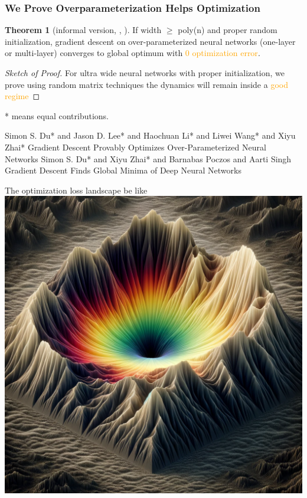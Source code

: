 \documentclass{beamer}   	%
\theoremstyle{definition}
\newtheorem*{thm}{Theorem}
\newcommand{\highlight}[1]{\textcolor{orange}{#1}}
\begin{document}
\begin{frame}
\frametitle{We Prove Overparameterization Helps Optimization}
\begin{thm}
	[informal version, \cite{op1}, \cite{op2}]
	If width $\ge$ poly(n) and proper random initialization, gradient descent on over-parameterized neural networks (one-layer or multi-layer) converges to global optimum with \highlight{0 optimization error}.
\end{thm}

\begin{proof}
	[Sketch of Proof]

	For ultra wide neural networks with proper initialization, we prove using random matrix techniques the dynamics will remain inside a \highlight{good regime}
\end{proof}

* means equal contributions.

\begin{thebibliography}{9}
\scriptsize
{}
Simon S. Du* and Jason D. Lee* and Haochuan Li* and Liwei Wang* and Xiyu Zhai*
Gradient Descent Provably Optimizes Over-Parameterized Neural Networks
Simon S. Du* and Xiyu Zhai* and Barnabas Poczos and Aarti Singh
Gradient Descent Finds Global Minima of Deep Neural Networks
\end{thebibliography}
\end{frame}

\begin{frame}
The optimization loss landscape be like
\includegraphics[width=\linewidth]{ultra_wide_nn_landscape.png}
\end{frame}
\end{document}
